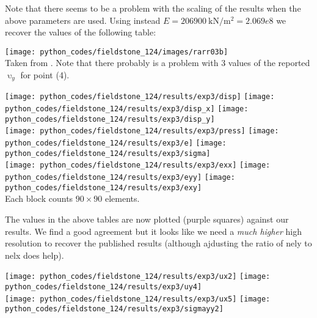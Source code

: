 Note that there seems to be a problem with the scaling of the results when the above 
parameters are used. Using instead $E=\SI{206 900}{\kilo\newton\per\square\meter}=2.069e8$
we recover the values of the following table: 
\begin{center}
\texttt{[image: python\_codes/fieldstone\_124/images/rarr03b]}\\
{\captionfont Taken from \textcite{rarr03}. Note that there probably is a 
problem with 3 values of the reported $\upupsilon_y$ for point (4).}
\end{center}


\begin{center}
\texttt{[image: python\_codes/fieldstone\_124/results/exp3/disp]}
\texttt{[image: python\_codes/fieldstone\_124/results/exp3/disp\_x]}
\texttt{[image: python\_codes/fieldstone\_124/results/exp3/disp\_y]}\\
\texttt{[image: python\_codes/fieldstone\_124/results/exp3/press]}
\texttt{[image: python\_codes/fieldstone\_124/results/exp3/e]}
\texttt{[image: python\_codes/fieldstone\_124/results/exp3/sigma]}\\
\texttt{[image: python\_codes/fieldstone\_124/results/exp3/exx]}
\texttt{[image: python\_codes/fieldstone\_124/results/exp3/eyy]}
\texttt{[image: python\_codes/fieldstone\_124/results/exp3/exy]}\\
{\captionfont Each block counts $90\times 90$ elements.}
\end{center}

The values in the above tables are now plotted (purple squares) against our results. 
We find a good agreement but it looks like we need a {\it much higher}
high resolution to recover the published results (although ajdusting the 
ratio of nely to nelx does help). 

\begin{center}
\texttt{[image: python\_codes/fieldstone\_124/results/exp3/ux2]}
\texttt{[image: python\_codes/fieldstone\_124/results/exp3/uy4]}\\
\texttt{[image: python\_codes/fieldstone\_124/results/exp3/ux5]}
\texttt{[image: python\_codes/fieldstone\_124/results/exp3/sigmayy2]}
\end{center}


